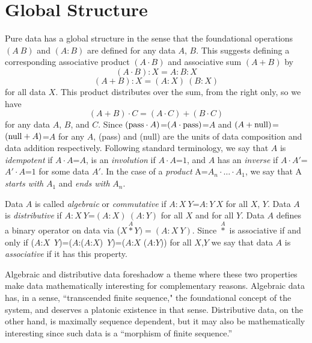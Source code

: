 \documentclass[11pt]{article}
\begin{document}
\section{Global Structure} 

    Pure data has a global structure in the sense that the foundational operations $(A\ B)$ and $(A:B)$ are defined for any data $A$, $B$.  
This suggests defining a corresponding associative product $(A\cdot B)$ and associative sum $(A+B)$ by    
\begin{equation}
(A \cdot B):X = A:B:X 
\end{equation}
\begin{equation}
(A+B):X = (A:X)\ (B:X) 
\end{equation}
for all data $X$. This product distributes over the sum, from the right only, so we have 
\begin{equation}
(A+B)\cdot C=(A\cdot C)+(B\cdot C) 
\end{equation}
for any data $A$, $B$, and $C$.
Since $({\rm pass}\cdot A)$=$(A\cdot {\rm pass})$=$A$ and $(A+{\rm null})$=$({\rm null}+A)$=$A$ for any $A$, (pass) and (null) are the units of data composition and 
data addition respectively.  
Following standard terminology, we say that $A$ is {\it idempotent} if $A\cdot A$=$A$, is an {\it involution} if $A\cdot A$=$1$, and $A$ has an {\it inverse} if $A\cdot A'$=$A'\cdot A$=$1$ for some data $A'$.   
In the case of a {\it product}  A=$A_n\cdot\dots\cdot A_1$, we say that A {\it starts with} $A_1$ and {\it ends with} $A_n$.   

Data $A$ is called {\it algebraic} or {\it commutative} if $A:X\ Y$=$A:Y\ X$ for all $X$, $Y$.  Data $A$ is 
{\it distributive} if $A:X\ Y$=$(A:X)\ (A:Y)$ for all $X$ and for all $Y$.  
Data $A$ defines a binary operator on data via ($X{\overset A\ast}Y)=(A:X\ Y)$.  Since ${\overset A\ast}$ is associative if and only if 
 ($A$:$X$\ $Y$)=($A$:($A$:$X$)\ $Y$)=($A$:$X$ ($A$:$Y$)) for all $X$,$Y$ we say that data $A$ is {\it associative} if it has this property.  
 
Algebraic and distributive data foreshadow a theme where these two properties make data mathematically interesting for complementary reasons.  
Algebraic data has, in a sense, ``transcended finite sequence," the foundational concept of the system, and deserves a platonic existence in 
that sense.  Distributive data, on the other hand, is maximally sequence dependent, but it may also be mathematically interesting since 
such data is a ``morphism of finite sequence.''   
 
\end{document}
